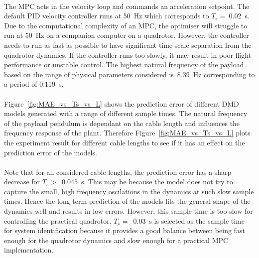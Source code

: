         \paragraph{}
        The MPC acts in the velocity loop and commands an acceleration setpoint.
        The default PID velocity controller runs at \SI{50}{\hertz} which corresponds to $T_s =~$\SI{0.02}{\second}.
        Due to the computational complexity of an MPC, the optimiser will struggle to run at \SI{50}{\hertz} on a companion computer on a quadrotor.
        However, the controller needs to run as fast as possible 
        to have significant time-scale separation from the quadrotor dynamics.
        If the controller runs too slowly, it may result in poor flight performance or unstable control.
        The highest natural frequency of the payload based on the range of physical parameters considered 
        is~\SI{8.39}{\hertz} corresponding to a period of \SI{0.119}{\second}.

        

        \paragraph{}
        Figure~\ref{fig:MAE_vs_Ts_vs_L} shows the prediction error of different DMD models 
        generated with a range of different sample times.
        The natural frequency of the payload pendulum is dependant on the cable length 
        and influences the frequency response of the plant.
        Therefore Figure~\ref{fig:MAE_vs_Ts_vs_L} plots the experiment result 
        for different cable lengths to see if it has an effect on the prediction error of the models.

        \paragraph{}
        Note that for all considered cable lengths, the prediction error has a sharp decrease for 
        $T_s >$~\SI{0.045}{\second}.
        This may be because the model does not try to capture the small, high frequency oscilations in the dynamics
        at such slow sample times.
        Hence the long term prediction of the models fits the general shape of the dynamics well and results in low errors.
        However, this sample time is too slow for controlling the practical quadrotor.
        $T_s =$~\SI{0.03}{\second} is selected as the sample time for system identification 
        because it provides a good balance between being fast enough for the quadrotor dynamics and slow enough for a practical MPC implementation.

